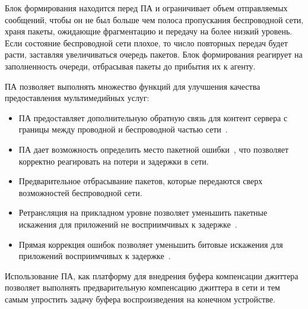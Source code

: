 Блок формирования находится перед ПА и ограничивает объем отправляемых сообщений, чтобы он не был больше чем полоса пропускания беспроводной сети, храня пакеты, ожидающие фрагментацию и передачу на более низкий уровень. Если состояние беспроводной сети плохое, то число повторных передач будет расти, заставляя увеличиваться очередь пакетов. Блок формирования реагирует на заполненность очереди, отбрасывая пакеты до прибытия их к агенту.

ПА позволяет выполнять множество функций для улучшения качества предоставления мультимедийных услуг:
\begin{itemize}
\item ПА предоставляет дополнительную обратную связь для контент сервера с границы между проводной  и беспроводной частью сети \cite{SAdouble_feedback}.
\item ПА дает возможность определить место пакетной ошибки \cite{SAdouble_feedback}, что позволяет корректно реагировать на потери и задержки в сети.
\item Предварительное отбрасывание пакетов, которые передаются сверх возможностей беспроводной сети.
\item Ретрансляция на прикладном уровне позволяет уменьшить  пакетные искажения  для приложений не восприимчивых к задержке \cite{SArateOpt, SArealtime}.
\item Прямая коррекция ошибок позволяет уменьшить битовые искажения для приложений восприимчивых к задержке \cite{SArateOpt, SArealtime}.
\end{itemize}

Использование ПА, как платформу для внедрения буфера компенсации джиттера позволяет выполнять предварительную компенсацию джиттера в сети и тем самым упростить задачу буфера воспроизведения  на конечном устройстве.





